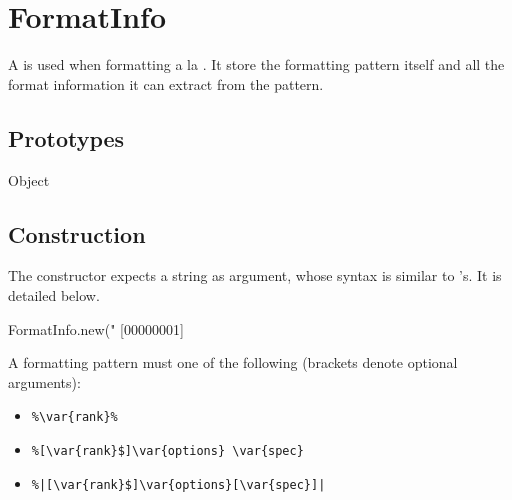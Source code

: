 
\section{FormatInfo}

A  is used when formatting a la . It
store the formatting pattern itself and all the format information it
can extract from the pattern.

\subsection{Prototypes}

\begin{refObjects}
\item[Object]
\end{refObjects}

\subsection{Construction}

The constructor expects a string as argument, whose syntax is similar
to 's.  It is detailed below.

\begin{urbiscript}[firstnumber=1]
FormatInfo.new("%
[00000001] %
\end{urbiscript}

A formatting pattern must one of the following (brackets denote
optional arguments):
\begin{itemize}
\item \lstinline&%\var{rank}%&
\item \lstinline&%[\var{rank}$]\var{options} \var{spec}&
\item \lstinline&%|[\var{rank}$]\var{options}[\var{spec}]|&
\end{itemize}

